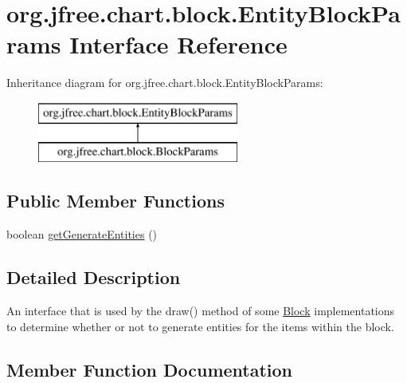 \hypertarget{interfaceorg_1_1jfree_1_1chart_1_1block_1_1_entity_block_params}{}\section{org.\+jfree.\+chart.\+block.\+Entity\+Block\+Params Interface Reference}
\label{interfaceorg_1_1jfree_1_1chart_1_1block_1_1_entity_block_params}
Inheritance diagram for org.\+jfree.\+chart.\+block.\+Entity\+Block\+Params\+:\begin{figure}[H]
\begin{center}
\leavevmode
\includegraphics[height=2.000000cm]{interfaceorg_1_1jfree_1_1chart_1_1block_1_1_entity_block_params}
\end{center}
\end{figure}
\subsection*{Public Member Functions}
\begin{DoxyCompactItemize}
\item 
boolean \mbox{\hyperlink{interfaceorg_1_1jfree_1_1chart_1_1block_1_1_entity_block_params_ad7adae21d0a6b47d5319b310fc515f00}{get\+Generate\+Entities}} ()
\end{DoxyCompactItemize}


\subsection{Detailed Description}
An interface that is used by the draw() method of some \mbox{\hyperlink{interfaceorg_1_1jfree_1_1chart_1_1block_1_1_block}{Block}} implementations to determine whether or not to generate entities for the items within the block. 

\subsection{Member Function Documentation}
\mbox{\label{interfaceorg_1_1jfree_1_1chart_1_1block_1_1_entity_block_params_ad7adae21d0a6b47d5319b310fc515f00}} 
